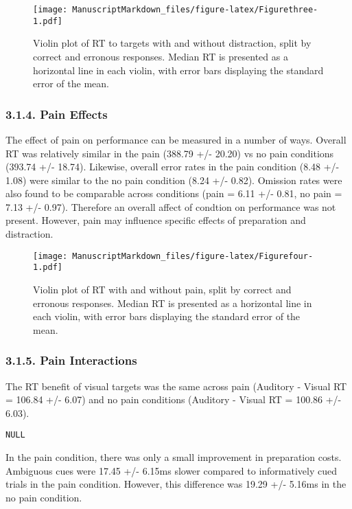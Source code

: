 \documentclass[
  english,
  ,man,floatsintext]{apa6}
\begin{document}
\begin{figure}
\centering
\texttt{[image: ManuscriptMarkdown\_files/figure-latex/Figurethree-1.pdf]}
\caption{\label{fig:Figurethree}Violin plot of RT to targets with and without distraction, split by correct and erronous responses. Median RT is presented as a horizontal line in each violin, with error bars displaying the standard error of the mean.}
\end{figure}

\hypertarget{pain-effects}{%
\subsubsection{3.1.4. Pain Effects}\label{pain-effects}}

The effect of pain on performance can be measured in a number of ways. Overall RT was relatively similar in the pain (388.79 +/- 20.20) vs no pain conditions (393.74 +/- 18.74). Likewise, overall error rates in the pain condition (8.48 +/- 1.08) were similar to the no pain condition (8.24 +/- 0.82). Omission rates were also found to be comparable across conditions (pain = 6.11 +/- 0.81, no pain = 7.13 +/- 0.97). Therefore an overall affect of condtion on performance was not present. However, pain may influence specific effects of preparation and distraction.

\begin{figure}
\centering
\texttt{[image: ManuscriptMarkdown\_files/figure-latex/Figurefour-1.pdf]}
\caption{\label{fig:Figurefour}Violin plot of RT with and without pain, split by correct and erronous responses. Median RT is presented as a horizontal line in each violin, with error bars displaying the standard error of the mean.}
\end{figure}

\hypertarget{pain-interactions}{%
\subsubsection{3.1.5. Pain Interactions}\label{pain-interactions}}

The RT benefit of visual targets was the same across pain (Auditory - Visual RT = 106.84 +/- 6.07) and no pain conditions (Auditory - Visual RT = 100.86 +/- 6.03).

\begin{verbatim}
NULL
\end{verbatim}

In the pain condition, there was only a small improvement in preparation costs. Ambiguous cues were 17.45 +/- 6.15ms slower compared to informatively cued trials in the pain condition. However, this difference was 19.29 +/- 5.16ms in the no pain condition.
\end{document}
